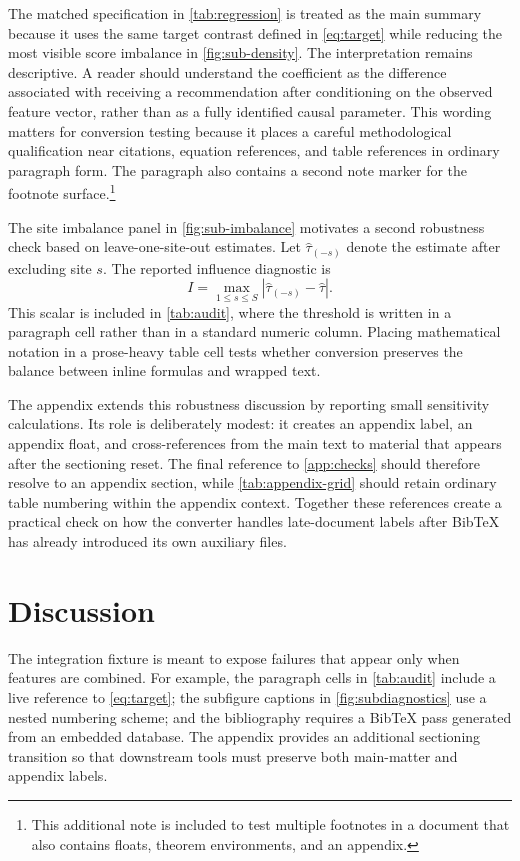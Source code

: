 The matched specification in \cref{tab:regression} is treated as the main summary because it uses the same target contrast defined in \cref{eq:target} while reducing the most visible score imbalance in \cref{fig:sub-density}. The interpretation remains descriptive. A reader should understand the coefficient as the difference associated with receiving a recommendation after conditioning on the observed feature vector, rather than as a fully identified causal parameter. This wording matters for conversion testing because it places a careful methodological qualification near citations, equation references, and table references in ordinary paragraph form. The paragraph also contains a second note marker for the footnote surface.\footnote{This additional note is included to test multiple footnotes in a document that also contains floats, theorem environments, and an appendix.}

The site imbalance panel in \cref{fig:sub-imbalance} motivates a second robustness check based on leave-one-site-out estimates. Let $\hat{\tau}_{(-s)}$ denote the estimate after excluding site $s$. The reported influence diagnostic is
\[
  I = \max_{1\leq s\leq S} |\hat{\tau}_{(-s)}-\hat{\tau}|.
\]
This scalar is included in \cref{tab:audit}, where the threshold is written in a paragraph cell rather than in a standard numeric column. Placing mathematical notation in a prose-heavy table cell tests whether conversion preserves the balance between inline formulas and wrapped text.

The appendix extends this robustness discussion by reporting small sensitivity calculations. Its role is deliberately modest: it creates an appendix label, an appendix float, and cross-references from the main text to material that appears after the sectioning reset. The final reference to \cref{app:checks} should therefore resolve to an appendix section, while \cref{tab:appendix-grid} should retain ordinary table numbering within the appendix context. Together these references create a practical check on how the converter handles late-document labels after BibTeX has already introduced its own auxiliary files.

\section{Discussion}

The integration fixture is meant to expose failures that appear only when features are combined. For example, the paragraph cells in \cref{tab:audit} include a live reference to \cref{eq:target}; the subfigure captions in \cref{fig:subdiagnostics} use a nested numbering scheme; and the bibliography requires a BibTeX pass generated from an embedded database. The appendix provides an additional sectioning transition so that downstream tools must preserve both main-matter and appendix labels.

